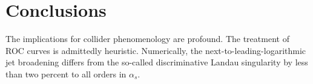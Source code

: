 \section{Conclusions}\label{sec:conclusions}

The implications for collider phenomenology are profound. The treatment
of ROC curves is admittedly heuristic. Numerically, the
next-to-leading-logarithmic jet broadening differs from the so-called
discriminative Landau singularity by less than two percent to all orders
in $\alpha_s$.

